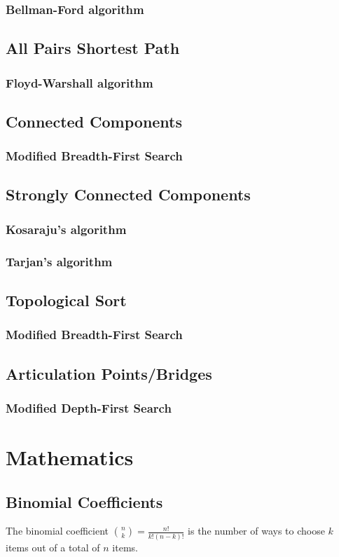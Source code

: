 \documentclass[11pt,a4paper,titlepage]{article}
\begin{document}
			\subsubsection{Bellman-Ford algorithm}
		\subsection{All Pairs Shortest Path}
			\subsubsection{Floyd-Warshall algorithm}
		\subsection{Connected Components}
			\subsubsection{Modified Breadth-First Search}
		\subsection{Strongly Connected Components}
			\subsubsection{Kosaraju's algorithm}
			\subsubsection{Tarjan's algorithm}
		\subsection{Topological Sort}
			\subsubsection{Modified Breadth-First Search}
		\subsection{Articulation Points/Bridges}
			\subsubsection{Modified Depth-First Search}

	\section{Mathematics}

		\subsection{Binomial Coefficients}
			The binomial coefficient $\binom{n}{k} = \frac{n!}{k!(n-k)!}$ is the number of ways to choose $k$ items out of a total of $n$ items.

			

			

			
\end{document}

